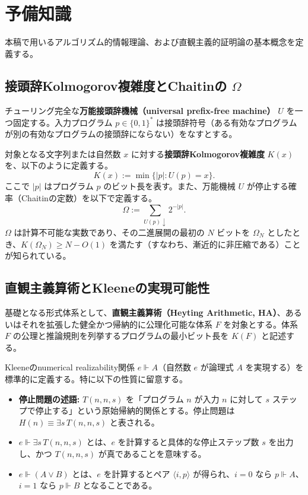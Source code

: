 \documentclass[a4paper,11pt]{ltjsarticle}
\theoremstyle{plain}
\begin{document}
\section{予備知識}

本稿で用いるアルゴリズム的情報理論、および直観主義的証明論の基本概念を定義する。

\subsection{接頭辞Kolmogorov複雑度とChaitinの $\Omega$}

チューリング完全な\textbf{万能接頭辞機械（universal prefix-free machine）} $U$ を一つ固定する。入力プログラム $p \in \{0, 1\}^*$ は接頭辞符号（ある有効なプログラムが別の有効なプログラムの接頭辞にならない）をなすとする。

対象となる文字列または自然数 $x$ に対する\textbf{接頭辞Kolmogorov複雑度} $K(x)$ を、以下のように定義する。
\[
K(x) := \min \{ \lvert p\rvert : U(p) = x \}.
\]
ここで $\lvert p\rvert$ はプログラム $p$ のビット長を表す。また、万能機械 $U$ が停止する確率（Chaitinの定数）を以下で定義する。
\[
\Omega := \sum_{U(p)\downarrow} 2^{-\lvert p\rvert}.
\]
$\Omega$ は計算不可能な実数であり、その二進展開の最初の $N$ ビットを $\Omega_N$ としたとき、$K(\Omega_N) \ge N - O(1)$ を満たす（すなわち、漸近的に非圧縮である）ことが知られている。

\subsection{直観主義算術とKleeneの実現可能性}

基礎となる形式体系として、\textbf{直観主義算術（Heyting Arithmetic, HA）}、あるいはそれを拡張した健全かつ帰納的に公理化可能な体系 $F$ を対象とする。体系 $F$ の公理と推論規則を列挙するプログラムの最小ビット長を $K(F)$ と記述する。

Kleeneのnumerical realizability関係 $e \Vdash A$（自然数 $e$ が論理式 $A$ を実現する）を標準的に定義する。特に以下の性質に留意する。

\begin{itemize}
\item \textbf{停止問題の述語:} $T(n, n, s)$ を「プログラム $n$ が入力 $n$ に対して $s$ ステップで停止する」という原始帰納的関係とする。停止問題は $H(n) \equiv \exists s\, T(n, n, s)$ と表される。
\item $e \Vdash \exists s\, T(n, n, s)$ とは、$e$ を計算すると具体的な停止ステップ数 $s$ を出力し、かつ $T(n, n, s)$ が真であることを意味する。
\item $e \Vdash (A \lor B)$ とは、$e$ を計算するとペア $\langle i, p \rangle$ が得られ、$i=0$ なら $p \Vdash A$、$i=1$ なら $p \Vdash B$ となることである。
\end{itemize}
\end{document}
